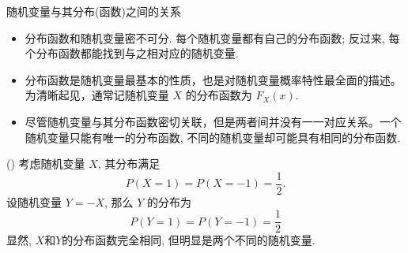\begin{frame}{随机变量与其分布(函数)之间的关系}
\begin{itemize}[<+-|alert@+>]
	\item 分布函数和随机变量密不可分. 每个随机变量都有自己的分布函数; 反过来, 每个分布函数都能找到与之相对应的随机变量.
	\item 分布函数是随机变量最基本的性质，也是对随机变量概率特性最全面的描述。为清晰起见，通常记随机变量 $X$ 的分布函数为 $F_{X}(x)$.
	\item 尽管随机变量与其分布函数密切关联，但是两者间并没有一一对应关系。一个随机变量只能有唯一的分布函数, 不同的随机变量却可能具有相同的分布函数.

\end{itemize}
\pause
\begin{exam}
  () 考虑随机变量 $X$, 其分布满足
	\[
	P(X=1)=P(X=-1)=\frac{1}{2}.
	\]\pause
	设随机变量 $Y=-X$, 那么 $Y$ 的分布为
	\[
	P(Y=1)=P(Y=-1)=\frac{1}{2}
	\]\pause
	显然, $X$和$Y$的分布函数完全相同, 但明显是两个不同的随机变量.
\end{exam}


\end{frame}

